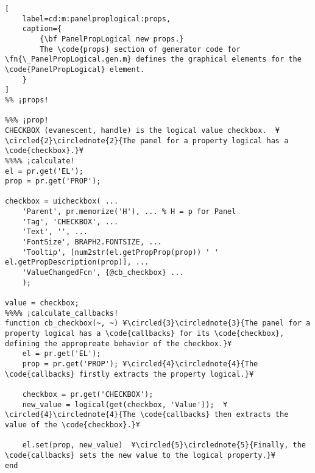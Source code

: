 \documentclass{tufte-handout}
\begin{document}
\begin{lstlisting}[
	label=cd:m:panelproplogical:props,
	caption={
		{\bf PanelPropLogical new props.}
		The \code{props} section of generator code for \fn{\_PanelPropLogical.gen.m} defines the graphical elements for the \code{PanelPropLogical} element.
	}
]
%% ¡props!

%%% ¡prop!
CHECKBOX (evanescent, handle) is the logical value checkbox.  ¥\circled{2}\circlednote{2}{The panel for a property logical has a \code{checkbox}.}¥
%%%% ¡calculate!
el = pr.get('EL');
prop = pr.get('PROP');

checkbox = uicheckbox( ...
    'Parent', pr.memorize('H'), ... % H = p for Panel
    'Tag', 'CHECKBOX', ...
    'Text', '', ...
    'FontSize', BRAPH2.FONTSIZE, ...
    'Tooltip', [num2str(el.getPropProp(prop)) ' ' el.getPropDescription(prop)], ...
    'ValueChangedFcn', {@cb_checkbox} ...
    );

value = checkbox;
%%%% ¡calculate_callbacks!
function cb_checkbox(~, ~) ¥\circled{3}\circlednote{3}{The panel for a property logical has a \code{callbacks} for its \code{checkbox}, defining the appropreate behavior of the checkbox.}¥
    el = pr.get('EL');
    prop = pr.get('PROP'); ¥\circled{4}\circlednote{4}{The \code{callbacks} firstly extracts the property logical.}¥
    
    checkbox = pr.get('CHECKBOX');
    new_value = logical(get(checkbox, 'Value'));  ¥\circled{4}\circlednote{4}{The \code{callbacks} then extracts the value of the \code{checkbox}.}¥
    
    el.set(prop, new_value)  ¥\circled{5}\circlednote{5}{Finally, the \code{callbacks} sets the new value to the logical property.}¥
end

\end{lstlisting}
\end{document}
